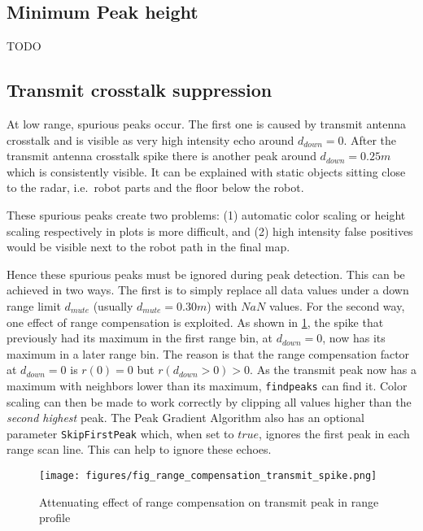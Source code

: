 \subsection{Minimum Peak height}\label{minimum-peak-height}
TODO

\subsection{Transmit crosstalk suppression}\label{transmit-crosstalk-suppression}

At low range, spurious peaks occur. The first one is caused by transmit
antenna crosstalk and is visible as very high intensity echo around
\(d_{down}=0\). After the transmit antenna crosstalk spike there is
another peak around \(d_{down}=0.25m\) which is consistently visible. It
can be explained with static objects sitting close to the radar,
i.e.~robot parts and the floor below the robot.

These spurious peaks create two problems: (1) automatic color scaling or
height scaling respectively in plots is more difficult, and (2) high
intensity false positives would be visible next to the robot path in the
final map.

Hence these spurious peaks must be ignored during peak detection. This
can be achieved in two ways. The first is to simply replace all data
values under a down range limit \(d_{mute}\) (usually
\(d_{mute}=0.30m\)) with \(NaN\) values. For the second way, one effect
of range compensation is exploited. As shown in \cref{fig:fig_range_compensation_transmit_spike}, the spike
that previously had its maximum in the first range bin, at
\(d_{down}=0\), now has its maximum in a later range bin. The reason is
that the range compensation factor at \(d_{down}=0\) is \(r(0) = 0\) but
\(r(d_{down}>0) > 0\). As the transmit peak now has a maximum with
neighbors lower than its maximum, \texttt{findpeaks} can find it. Color
scaling can then be made to work correctly by clipping all values higher
than the \emph{second highest} peak. The Peak Gradient Algorithm also
has an optional parameter \texttt{SkipFirstPeak} which, when set to
\(true\), ignores the first peak in each range scan line. This can help
to ignore these echoes.

\begin{figure}[htbp]
    \centering
    \texttt{[image: figures/fig\_range\_compensation\_transmit\_spike.png]}
    \caption{Attenuating effect of range compensation on transmit peak in range profile}
    \label{fig:fig_range_compensation_transmit_spike}
\end{figure}

